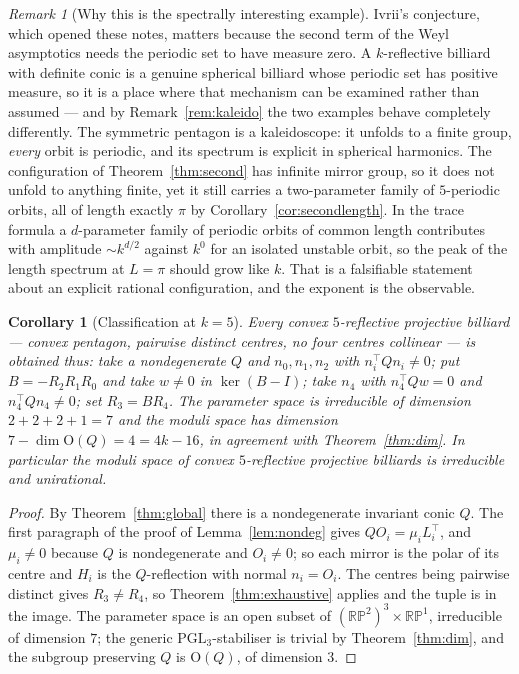 \documentclass[11pt,a4paper]{article}
\theoremstyle{plain}
\newtheorem{corollary}[theorem]{Corollary}
\theoremstyle{definition}
\theoremstyle{remark}
\newtheorem{remark}[theorem]{Remark}
\newcommand{\RP}{\mathbb{RP}}
\newcommand{\PGL}{\mathrm{PGL}}
\begin{document}
\begin{remark}[Why this is the spectrally interesting example]\label{rem:spectral}
Ivrii's conjecture, which opened these notes, matters because the second term of
the Weyl asymptotics needs the periodic set to have measure zero. A
$k$-reflective billiard with definite conic is a genuine spherical billiard whose
periodic set has positive measure, so it is a place where that mechanism can be
examined rather than assumed --- and by Remark~\ref{rem:kaleido} the two examples
behave completely differently. The symmetric pentagon is a kaleidoscope: it
unfolds to a finite group, \emph{every} orbit is periodic, and its spectrum is
explicit in spherical harmonics. The configuration of Theorem~\ref{thm:second} has
infinite mirror group, so it does not unfold to anything finite, yet it still
carries a two-parameter family of $5$-periodic orbits, all of length exactly $\pi$
by Corollary~\ref{cor:secondlength}. In the trace formula a $d$-parameter family
of periodic orbits of common length contributes with amplitude $\sim k^{d/2}$
against $k^0$ for an isolated unstable orbit, so the peak of the length spectrum at
$L=\pi$ should grow like $k$. That is a falsifiable statement about an explicit
rational configuration, and the exponent is the observable.
\end{remark}

\begin{corollary}[Classification at $k=5$]\label{cor:classification}
Every convex $5$-reflective projective billiard --- convex pentagon, pairwise
distinct centres, no four centres collinear --- is obtained thus: take a
nondegenerate $Q$ and $n_0,n_1,n_2$ with $n_i^\top Qn_i\neq0$; put
$B=-R_2R_1R_0$ and take $w\neq0$ in $\ker(B-I)$; take $n_4$ with $n_4^\top Qw=0$
and $n_4^\top Qn_4\neq0$; set $R_3=BR_4$. The parameter space is irreducible of
dimension $2+2+2+1=7$ and the moduli space has dimension
$7-\dim\mathrm{O}(Q)=4=4k-16$, in agreement with Theorem~\ref{thm:dim}. In
particular the moduli space of convex $5$-reflective projective billiards is
irreducible and unirational.
\end{corollary}

\begin{proof}
By Theorem~\ref{thm:global} there is a nondegenerate invariant conic $Q$. The first
paragraph of the proof of Lemma~\ref{lem:nondeg} gives $QO_i=\mu_iL_i^\top$, and
$\mu_i\neq0$ because $Q$ is nondegenerate and $O_i\neq0$; so each mirror is the
polar of its centre and $H_i$ is the $Q$-reflection with normal $n_i=O_i$. The
centres being pairwise distinct gives $R_3\neq R_4$, so
Theorem~\ref{thm:exhaustive} applies and the tuple is in the image. The parameter
space is an open subset of $(\RP^2)^3\times\RP^1$, irreducible of dimension $7$;
the generic $\PGL_3$-stabiliser is trivial by Theorem~\ref{thm:dim}, and the
subgroup preserving $Q$ is $\mathrm{O}(Q)$, of dimension $3$.
\end{proof}
\end{document}
